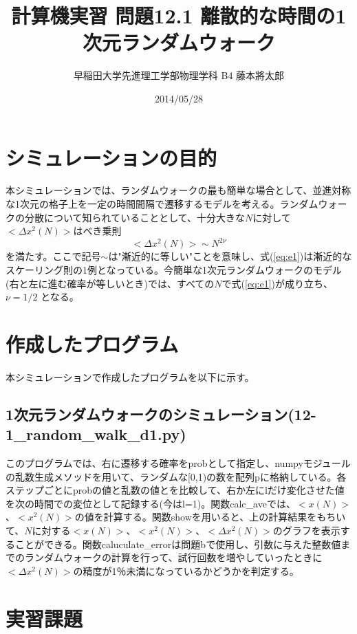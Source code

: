\documentclass{jsarticle}
\title{計算機実習 問題12.1 離散的な時間の1次元ランダムウォーク}
\author{早稲田大学先進理工学部物理学科 B4 藤本將太郎}
\date{2014/05/28}
\begin{document}
\maketitle
    
    \section{シミュレーションの目的}
        本シミュレーションでは、ランダムウォークの最も簡単な場合として、並進対称な1次元の格子上を一定の時間間隔で遷移するモデルを考える。ランダムウォークの分散について知られていることとして、十分大きな$N$に対して$< \Delta x^{2}(N)> $はべき乗則
        \begin{equation}
            <\Delta x^{2}(N)> \sim N^{2\nu}
            \label{eq:e1}
        \end{equation}
        を満たす。ここで記号$\sim$は"漸近的に等しい"ことを意味し、式(\ref{eq:e1})は漸近的なスケーリング則の1例となっている。今簡単な1次元ランダムウォークのモデル(右と左に進む確率が等しいとき)では、すべての$N$で式(\ref{eq:e1})が成り立ち、$\nu = 1/2$ となる。

    \section{作成したプログラム}
        本シミュレーションで作成したプログラムを以下に示す。
    
    
        \subsection{1次元ランダムウォークのシミュレーション(12-1\_random\_walk\_d1.py)}
        このプログラムでは、右に遷移する確率をprobとして指定し、numpyモジュールの乱数生成メソッドを用いて、ランダムな[0,1)の数を配列pに格納している。各ステップごとにprobの値と乱数の値とを比較して、右か左にlだけ変化させた値を次の時間での変位として記録する(今はl=1)。関数calc\_aveでは、$<x(N)> $、$< x^{2}(N)> $の値を計算する。関数showを用いると、上の計算結果をもちいて、$N$に対する$<x(N)> $、$<x^{2}(N)> $、$<\Delta x^{2}(N)> $のグラフを表示することができる。関数caluculate\_errorは問題bで使用し、引数に与えた整数値までのランダムウォークの計算を行って、試行回数を増やしていったときに$< \Delta x^{2}(N)> $の精度が1％未満になっているかどうかを判定する。
            
    \section{実習課題}
    
\end{document}
